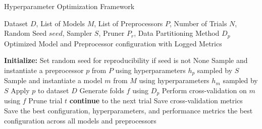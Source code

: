 \begin{algorithm}
\caption{Hyperparameter Optimization Framework}
\label{alg:hyperparameter_optimization_framework}
\begin{algorithmic}[1]
\Require Dataset $D$, List of Models $M$, List of Preprocessors $P$, Number of Trials $N$, Random Seed $seed$, Sampler $S$, Pruner $P_r$, Data Partitioning Method $D_p$
\Ensure Optimized Model and Preprocessor configuration with Logged Metrics

\State \textbf{Initialize:} Set random seed for reproducibility if seed is not None \label{step:initialize}
 \label{step:trial_loop}
    \State Sample and instantiate a preprocessor $p$ from $P$ \newline \hspace*{1.2em} using hyperparameters $h_p$ sampled by $S$ \label{step:sample_and_instantiate_preprocessor}
    \State Sample and instantiate a model $m$ from $M$ \newline \hspace*{1.2em} using hyperparameters $h_m$ sampled by $S$ \label{step:sample_and_instantiate_model}
    \State Apply $p$ to dataset $D$ \label{step:apply_preprocessor}
    \State Generate folds $f$ using $D_p$ \label{step:generate_folds}
    \State Perform cross-validation on $m$ using $f$ \label{step:perform_cross_validation}
     \label{step:check_pruning}
        \State Prune trial $t$ \label{step:prune_trial}
        \State \textbf{continue} to the next trial \label{step:continue_to_next_trial}
    \EndIf
    \State Save cross-validation metrics \label{step:save_metrics}
\EndFor
\State Save the best configuration, hyperparameters, and performance metrics \label{step:save_best_configuration}
\State \Return the best configuration across all models and preprocessors \label{step:return_best_configuration}

\end{algorithmic}
\end{algorithm}%


